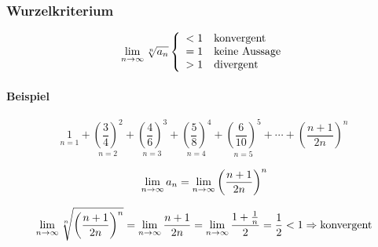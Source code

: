 \subsubsection{Wurzelkriterium}

\[
    \lim_{n \rightarrow \infty} \sqrt[n]{a_n}
    \left \{
    \begin{array}{l}
        < 1 \quad \text{konvergent} \\
        = 1 \quad \text{keine Aussage} \\
        > 1 \quad \text{divergent}
    \end{array}  
    \right .
\]

\paragraph{Beispiel}

\[
    \underset{n=1}{1} + 
    \underset{n=2}{\left( \frac{3}{4} \right)^2} +
    \underset{n=3}{\left( \frac{4}{6} \right)^3} +
    \underset{n=4}{\left( \frac{5}{8} \right)^4} +
    \underset{n=5}{\left( \frac{6}{10} \right)^5} +
    \cdots + \left( \frac{n+1}{2n} \right)^n
\]

\[
    \lim_{n \rightarrow \infty} a_n = \lim_{n \rightarrow \infty} \left( \frac{n + 1}{2n} \right)^n
\]

\[
    \lim_{n \rightarrow \infty} \sqrt[n]{\left( \frac{n+1}{2n} \right)^n} =
    \lim_{n \rightarrow \infty} \frac{n+1}{2n} =
    \lim_{n \rightarrow \infty} \frac{1 + \frac{1}{n}}{2} =
    \frac{1}{2} < 1 \Rightarrow \text{konvergent}
\]
